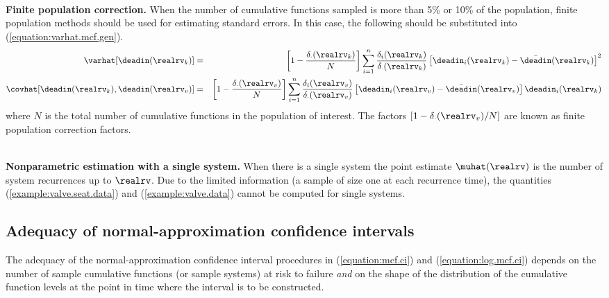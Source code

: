 \mbox{}\\
\noindent
{\bf Finite population correction.}
When the number of cumulative functions sampled is more than 5\% or 10\% 
of the population, 
finite population methods should be used for estimating standard errors.
In this case, the following should be substituted into
(\ref{equation:varhat.mcf.gen}).
\begin{eqnarray*}
\varhat[\deadin(\realrv_{k})]&=&
\left [
1 -\frac{\delta_{\cdot}(\realrv_{k})}
	{N}
\right ]
\sum_{i=1}^{n}
\frac{
\delta_{i}(\realrv_{k})
     }
     {
\delta_{\cdot}(\realrv_{k})
     }
\left [\deadin_{i}(\realrv_{k})
-\bar{\deadin}(\realrv_{k}) \right ]^{2}
\\
\covhat[\deadin(\realrv_{k}),\deadin(\realrv_{v})]
&=&
\left[
1 -\frac{\delta_{\cdot}(\realrv_{v})}
	{N}
\right ]
\sum_{i=1}^{n}
\frac{
\delta_{i}(\realrv_{v})
     }
     {
\delta_{\cdot}(\realrv_{v})
     }
\left [\deadin_{i}(\realrv_{v})
-\bar{\deadin}(\realrv_{v}) \right ]
\deadin_{i}(\realrv_{k})
\end{eqnarray*}
where $N$ is the total number of cumulative functions in the
population of interest.  The factors 
$[ 1-  \delta_{\cdot}(\realrv_{v})/N ]$ 
are known as finite
population correction factors.

\mbox{}\\
\noindent
{\bf Nonparametric estimation with a single system.}
When there is a single system the point estimate $\muhat(\realrv)$
is the number of system recurrences up to $\realrv$.  Due to the limited
information (a sample of size one at each recurrence time), the quantities
(\ref{example:valve.seat.data}) and (\ref{example:valve.data}) cannot be 
computed for single systems.

\subsection{Adequacy of normal-approximation confidence intervals}
The adequacy of the normal-approximation confidence interval
procedures in (\ref{equation:mcf.ci}) and (\ref{equation:log.mcf.ci})
depends on the number of sample cumulative functions (or sample
systems) at risk to failure {\em and} on the shape of the distribution
of the cumulative function levels at the point in time where the
interval is to be constructed.

